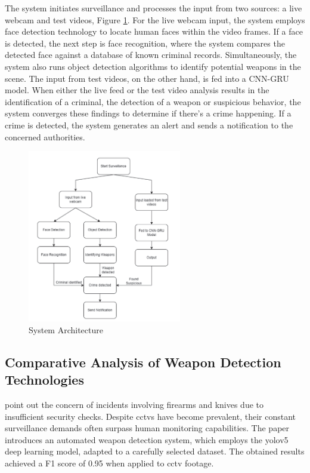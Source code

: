 The \citet{rfc7} system initiates surveillance and processes the input from two sources: a live webcam and test videos, Figure \ref{fig:shenoy-architecture}. For the live webcam input, the system employs face detection technology to locate human faces within the video frames. If a face is detected, the next step is face recognition, where the system compares the detected face against a database of known criminal records. Simultaneously, the system also runs object detection algorithms to identify potential weapons in the scene. The input from test videos, on the other hand, is fed into a CNN-GRU model. When either the live feed or the test video analysis results in the identification of a criminal, the detection of a weapon or suspicious behavior, the system converges these findings to determine if there's a crime happening. If a crime is detected, the system generates an alert and sends a notification to the concerned authorities.

\begin{figure}[h]
    \centering 
    \includegraphics[width=0.6\textwidth]{figs/shenoy-architecture.png} 
    \caption{\citet{rfc7} System Architecture}
    \label{fig:shenoy-architecture}
\end{figure}

\subsection{Comparative Analysis of Weapon Detection Technologies}
\citet{rfc3} point out the concern of incidents involving firearms and knives due to insufficient security checks. Despite \ac{cctv}s have become prevalent, their constant surveillance demands often surpass human monitoring capabilities. The paper introduces an automated weapon detection system, which employs the \ac{yolo}v5 deep learning model, adapted to a carefully selected dataset. The obtained results achieved a F1 score of 0.95 when applied to \ac{cctv} footage.

